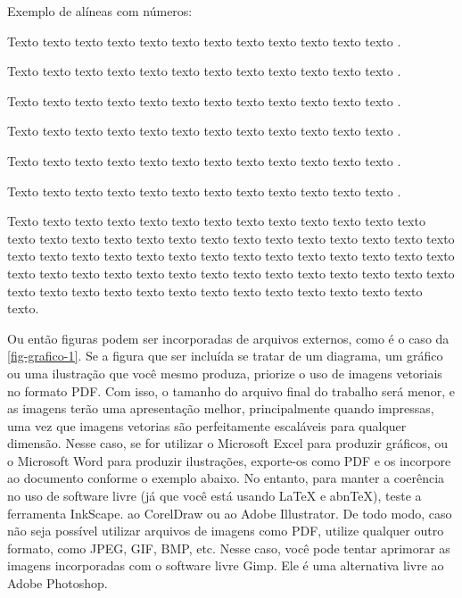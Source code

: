 
    Exemplo de alíneas com números:

    \begin{alineascomnumero}
	    \item Texto texto texto texto texto texto texto texto texto texto texto texto .
	    \item Texto texto texto texto texto texto texto texto texto texto texto texto .
	    \item Texto texto texto texto texto texto texto texto texto texto texto texto .
	    \item Texto texto texto texto texto texto texto texto texto texto texto texto .
	    \item Texto texto texto texto texto texto texto texto texto texto texto texto .
	    \item Texto texto texto texto texto texto texto texto texto texto texto texto .
    \end{alineascomnumero}

    Texto texto texto texto texto texto texto texto texto texto texto texto texto texto texto texto texto texto texto texto texto texto texto texto texto texto texto texto texto texto texto texto texto texto texto texto texto texto texto texto texto texto texto texto texto texto texto texto texto texto texto texto texto texto texto texto texto texto texto texto texto texto texto texto texto texto texto texto texto.

    Ou então figuras podem ser incorporadas de arquivos externos, como é o caso da \autoref{fig-grafico-1}. Se a figura que ser incluída se tratar de um diagrama, um gráfico ou uma ilustração que você mesmo produza, priorize o uso de imagens vetoriais no formato PDF. Com isso, o tamanho do arquivo final do trabalho será menor, e as imagens terão uma apresentação melhor, principalmente quando impressas, uma vez que imagens vetorias são perfeitamente escaláveis para qualquer dimensão. Nesse caso, se for utilizar o Microsoft Excel para produzir gráficos, ou o Microsoft Word para produzir ilustrações, exporte-os como PDF e os incorpore ao documento conforme o exemplo abaixo. No entanto, para manter a coerência no uso de software livre (já que você está usando LaTeX e abnTeX),  teste a ferramenta InkScape. ao CorelDraw ou ao Adobe Illustrator.  De todo modo, caso não seja possível  utilizar arquivos de imagens como PDF, utilize qualquer outro formato, como JPEG, GIF, BMP, etc.  Nesse caso, você pode tentar aprimorar as imagens incorporadas com o software livre Gimp. Ele é uma alternativa livre ao Adobe Photoshop.

